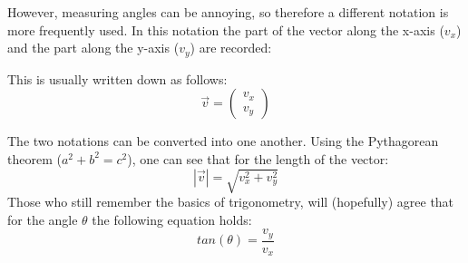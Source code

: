 \documentclass[a4paper]{report}
\begin{document}
However, measuring angles can be annoying, so therefore a different notation is more frequently used. In this notation the part of the vector along the x-axis ($v_x$) and the part along the y-axis ($v_y$) are recorded:
\begin{center}
\end{center}
This is usually written down as follows:
\begin{equation}
\vec{v} = 
\begin{pmatrix}
v_x \\
v_y
\end{pmatrix}
\label{vector}
\end{equation}
\clearpage
\begin{mdframed}
The two notations can be converted into one another. Using the Pythagorean theorem ($a^2+b^2 = c^2$), one can see that for the length of the vector:
\begin{equation*}
|\vec{v}| = \sqrt{v_x^2 + v_y^2}
\end{equation*}
Those who still remember the basics of trigonometry, will (hopefully) agree that for the angle $\theta$ the following equation holds:
\begin{equation*}
tan(\theta) = \frac{v_y}{v_x}
\end{equation*}
$\;$
\end{mdframed}
\end{document}
